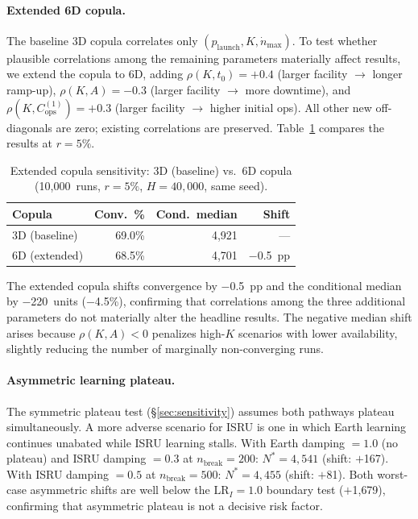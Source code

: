 \documentclass[preprint,12pt]{elsarticle}
\begin{document}
\paragraph{Extended 6D copula.} The baseline 3D copula correlates only $(p_{\mathrm{launch}}, K, \dot{n}_{\max})$. To test whether plausible correlations among the remaining parameters materially affect results, we extend the copula to 6D, adding $\rho(K, t_0) = +0.4$ (larger facility $\to$ longer ramp-up), $\rho(K, A) = -0.3$ (larger facility $\to$ more downtime), and $\rho(K, C_{\mathrm{ops}}^{(1)}) = +0.3$ (larger facility $\to$ higher initial ops). All other new off-diagonals are zero; existing correlations are preserved. Table~\ref{tab:copula_6d} compares the results at $r = 5\%$.

\begin{table}[htbp]
\centering
\caption{Extended copula sensitivity: 3D (baseline) vs.\ 6D copula (10{,}000~runs, $r = 5\%$, $H = 40{,}000$, same seed).}
\label{tab:copula_6d}
\small
\begin{tabular}{@{}lrrr@{}}
\toprule
Copula & Conv.\ \% & Cond.\ median & Shift \\
\midrule
3D (baseline) & 69.0\% & 4{,}921 & --- \\
6D (extended) & 68.5\% & 4{,}701 & $-$0.5~pp \\
\bottomrule
\end{tabular}
\end{table}

The extended copula shifts convergence by $-$0.5~pp and the conditional median by $-$220~units ($-$4.5\%), confirming that correlations among the three additional parameters do not materially alter the headline results. The negative median shift arises because $\rho(K, A) < 0$ penalizes high-$K$ scenarios with lower availability, slightly reducing the number of marginally non-converging runs.

\paragraph{Asymmetric learning plateau.} The symmetric plateau test (\S\ref{sec:sensitivity}) assumes both pathways plateau simultaneously. A more adverse scenario for ISRU is one in which Earth learning continues unabated while ISRU learning stalls. With Earth damping $= 1.0$ (no plateau) and ISRU damping $= 0.3$ at $n_{\mathrm{break}} = 200$: $N^* = 4{,}541$ (shift: $+$167). With ISRU damping $= 0.5$ at $n_{\mathrm{break}} = 500$: $N^* = 4{,}455$ (shift: $+$81). Both worst-case asymmetric shifts are well below the $\mathrm{LR}_I = 1.0$ boundary test ($+$1{,}679), confirming that asymmetric plateau is not a decisive risk factor.
\end{document}
